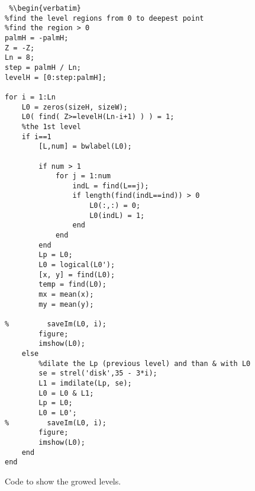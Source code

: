 \begin{lstlisting} %\begin{verbatim}
%find the level regions from 0 to deepest point
%find the region > 0
palmH = -palmH;
Z = -Z;
Ln = 8;
step = palmH / Ln;
levelH = [0:step:palmH];

for i = 1:Ln
    L0 = zeros(sizeH, sizeW);
    L0( find( Z>=levelH(Ln-i+1) ) ) = 1;
    %the 1st level
    if i==1
        [L,num] = bwlabel(L0);

        if num > 1
            for j = 1:num
                indL = find(L==j);
                if length(find(indL==ind)) > 0
                    L0(:,:) = 0;
                    L0(indL) = 1;
                end
            end
        end
        Lp = L0;
        L0 = logical(L0');
        [x, y] = find(L0);
        temp = find(L0);
        mx = mean(x);
        my = mean(y);

%         saveIm(L0, i);
        figure;
        imshow(L0);
    else
        %dilate the Lp (previous level) and than & with L0
        se = strel('disk',35 - 3*i);
        L1 = imdilate(Lp, se);
        L0 = L0 & L1;
        Lp = L0;
        L0 = L0';
%         saveIm(L0, i);
        figure;
        imshow(L0);
    end
end
\end{lstlisting} %
\clearpage


Code to show the growed levels.

